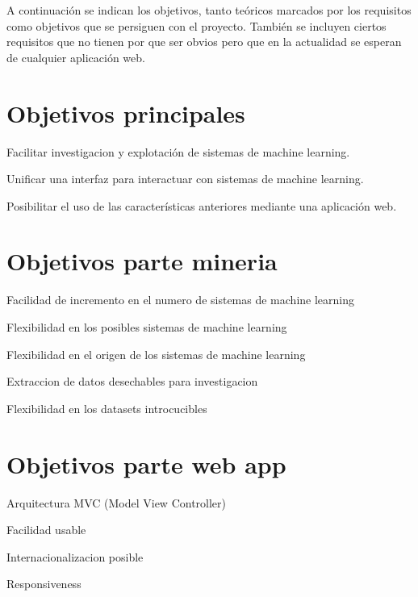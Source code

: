 
A continuación se indican los objetivos, tanto teóricos marcados por los requisitos como objetivos que se persiguen con el proyecto. También se incluyen ciertos requisitos que no tienen por que ser obvios pero que en la actualidad se esperan de cualquier aplicación web.



\section{Objetivos principales} 
\begin{list}{-}{}
\item Facilitar investigacion y explotación de sistemas de machine learning.
\item Unificar una interfaz para interactuar con sistemas de machine learning.
\item Posibilitar el uso de las características anteriores mediante una aplicación web.
\end{list}

\section{Objetivos parte mineria}
\begin{list}{-}{}

\item Facilidad de incremento en el numero de sistemas de machine learning 
\item Flexibilidad en los posibles sistemas de machine learning
\item Flexibilidad en el origen de los sistemas de machine learning
\item Extraccion de datos desechables para investigacion
\item Flexibilidad en los datasets introcucibles

\end{list}

\section{Objetivos parte web app}
\begin{list}{-}{}
\item Arquitectura MVC (Model View Controller)
\item Facilidad usable
\item Internacionalizacion posible
\item Responsiveness
\end{list}

